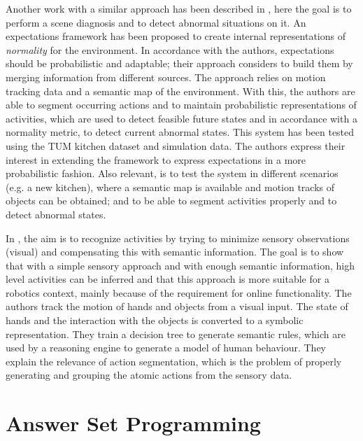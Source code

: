 Another work with a similar approach has been described in \citep{karg13expectations,karg13simultaneous,karg11towards,karg12acquisition}, here the goal is to perform a scene diagnosis and to detect abnormal situations on it.
An expectations framework has been proposed to create internal representations of \textit{normality} for the environment.
In accordance with the authors, expectations should be probabilistic and adaptable; their approach considers to build them by merging information from different sources.
The approach relies on motion tracking data and a semantic map of the environment.
With this, the authors are able to segment occurring actions and to maintain probabilistic representations of activities, which are used to detect feasible future states and in accordance with a normality metric, to detect current abnormal states.
This system has been tested using the TUM kitchen dataset \citep{Tenorth2009_TUMKData} and simulation data.
The authors express their interest in extending the framework to express expectations in a more probabilistic fashion.
Also relevant, is to test the system in different scenarios (e.g. a new kitchen), where a semantic map is available and motion tracks of objects can be obtained; and to be able to segment activities properly and to detect abnormal states.

In \citep{ramirez14Iros}, the aim is to recognize activities by trying to minimize sensory observations (visual) and compensating this with semantic information. 
The goal is to show that with a simple sensory approach and with enough semantic information, high level activities can be inferred and that this approach is more suitable for a robotics context, mainly because of the requirement for online functionality.
The authors track the motion of hands and objects from a visual input. 
The state of hands and the interaction with the objects is converted to a symbolic representation.
They train a decision tree to generate semantic rules, which are used by a reasoning engine to generate a model of human behaviour.
They explain the relevance of action segmentation, which is the problem of properly generating and grouping the atomic actions from the sensory data.



\section{Answer Set Programming} %

